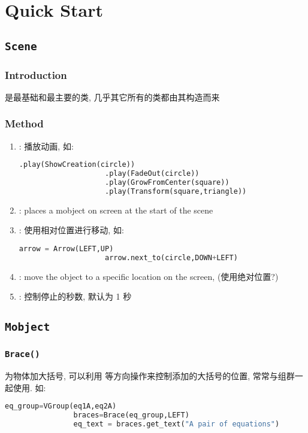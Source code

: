 \chapter{Quick Start}
\section{\texttt{Scene}}
    \subsection{Introduction}
        \hspace*{2em}  是最基础和最主要的类, 几乎其它所有的类都由其构造而来

    \subsection{Method}
        \begin{enumerate}
            \item {}: 播放动画, 如:
                \begin{lstlisting}[language=Python, gobble=20]
                    .play(ShowCreation(circle))
                    .play(FadeOut(circle))
                    .play(GrowFromCenter(square))
                    .play(Transform(square,triangle))
                \end{lstlisting}
            \item {}: places a mobject on screen at the start of the scene
            \item {}: 使用相对位置进行移动, 如:
                \begin{lstlisting}[language = {Python}, gobble = 20]
                    arrow = Arrow(LEFT,UP)
                    arrow.next_to(circle,DOWN+LEFT)
                \end{lstlisting}
            \item {}: move the object to a specific location on the screen, (使用绝对位置?)
            \item {}: 控制停止的秒数, 默认为 1 秒
        \end{enumerate}

\section{\texttt{Mobject}}
    \subsection{\texttt{Brace()}}
        为物体加大括号, 可以利用  等方向操作来控制添加的大括号的位置, 常常与组群一起使用. 如:
            \begin{lstlisting}[language = {Python}, gobble = 16]
                eq_group=VGroup(eq1A,eq2A)
                braces=Brace(eq_group,LEFT)
                eq_text = braces.get_text("A pair of equations")
            \end{lstlisting}


